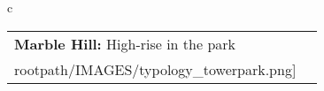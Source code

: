 \begin{table}[H]
        \begin{tabular}{c}
        \begin{tabular}{m{1.5in} m{2in}}
\textbf{Marble Hill:} {High-rise in the park} & \texttt{[image: \\rootpath/IMAGES/typology\_towerpark.png]}
\end{tabular}\end{tabular}
        \end{table}